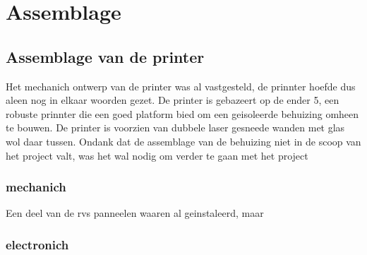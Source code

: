 \chapter{Assemblage}
\label{Assemblage}

\section{Assemblage van de printer}

Het mechanich ontwerp van de printer was al vastgesteld, de prinnter hoefde dus aleen nog in elkaar woorden gezet. 
De printer is gebazeert op de ender 5, een robuste prinnter die een goed platform bied om een geisoleerde behuizing omheen te bouwen.
De printer is voorzien van dubbele laser gesneede wanden met glas wol daar tussen.
Ondank dat de assemblage van de behuizing niet in de scoop van het project valt, was het wal nodig om verder te gaan met het project

\subsection{mechanich}

Een deel van de rvs panneelen waaren al geinstaleerd, maar

\subsection{electronich}


